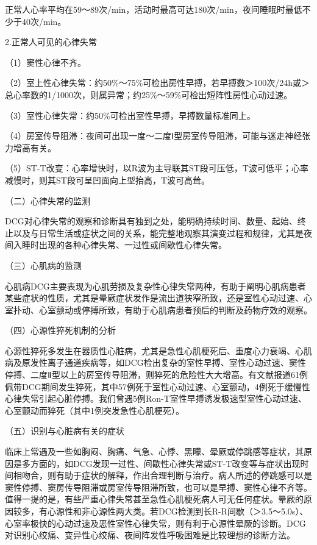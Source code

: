 正常人心率平均在59～89次/min，活动时最高可达180次/min，夜间睡眠时最低不少于40次/min。

2.正常人可见的心律失常

（1）窦性心律不齐。

（2）室上性心律失常：约50\%～75\%可检出房性早搏，若早搏数＞100次/24h或＞总心率数的1/1000次，则属异常；约25\%～59\%可检出短阵性房性心动过速。

（3）室性心律失常：约50\%可检出室性早搏，早搏数量标准同上。

（4）房室传导阻滞：夜间可出现一度～二度Ⅰ型房室传导阻滞，可能与迷走神经张力增高有关。

（5）ST-T改变：心率增快时，以R波为主导联其ST段可压低，T波可低平；心率减慢时，则其ST段可呈凹面向上型抬高，T波可高耸。

（二）心律失常的监测

DCG对心律失常的观察和诊断具有独到之处，能明确持续时间、数量、起始、终止以及与日常生活或症状之间的关系，能完整地观察其演变过程和规律，尤其是夜间入睡时出现的各种心律失常、一过性或间歇性心律失常。

（三）心肌病的监测

心肌病DCG主要表现为心肌劳损及复杂性心律失常两种，有助于阐明心肌病患者某些症状的性质，尤其是晕厥症状发作是流出道狭窄所致，还是室性心动过速、心室扑动、心室颤动或停搏所致，有助于心肌病患者预后的判断及药物疗效的观察。

（四）心源性猝死机制的分析

心源性猝死多发生在器质性心脏病，尤其是急性心肌梗死后、重度心力衰竭、心肌病及原发性离子通道疾病等，如DCG检出复杂的室性早搏、室性心动过速、窦性停搏、二度Ⅱ型以上的房室传导阻滞，则猝死的危险性大大增高。有文献报道61例佩带DCG期间发生猝死，其中57例死于室性心动过速、心室颤动，4例死于缓慢性心律失常引起心脏停搏。我们曾遇5例Ron-T室性早搏诱发极速型室性心动过速、心室颤动而猝死（其中1例突发急性心肌梗死）。

（五）识别与心脏病有关的症状

临床上常遇及一些如胸闷、胸痛、气急、心悸、黑矇、晕厥或停跳感等症状，其原因是多方面的，如DCG发现一过性、间歇性心律失常或ST-T改变等与症状出现时间相吻合，则有助于症状的解释，作出合理判断与治疗。病人所述的停跳感可以是窦性停搏、窦房传导阻滞或房室传导阻滞所致，也可以是早搏、窦性心律不齐等。值得一提的是，有些严重心律失常甚至急性心肌梗死病人可无任何症状。晕厥的原因较多，有心源性和非心源性两大类。若DCG检测到长R-R间歇（＞3.5～5.0s）、心室率极快的心动过速及恶性室性心律失常，则有利于心源性晕厥的诊断。DCG对识别心绞痛、变异性心绞痛、夜间阵发性呼吸困难是比较理想的诊断方法。

